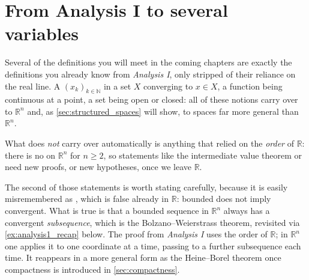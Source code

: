 \section{From Analysis I to several variables}
\label{sec:analysis1_recap}

Several of the definitions you will meet in the coming chapters are exactly the definitions you
already know from \emph{Analysis I}, only stripped of their reliance on the real line. A
  $(x_k)_{k \in \mathbb{N}}$ in a set $X$ converging to
$x \in X$, a function being continuous at a point, a set being open or closed: all of these
notions carry over to $\mathbb{R}^n$ and, as \cref{sec:structured_spaces} will show, to spaces far
more general than $\mathbb{R}^n$.

What does \emph{not} carry over automatically is anything
that relied on the \emph{order} of $\mathbb{R}$: there is no \qt{$\leq$} on $\mathbb{R}^n$ for
$n \geq 2$, so statements like the intermediate value theorem or  need new proofs, or new hypotheses, once we leave $\mathbb{R}$.

\begin{remark}
The second of those statements is worth stating carefully, because it is easily misremembered as
, which is false already in $\mathbb{R}$: bounded does not
imply convergent. What is true is that a bounded sequence in $\mathbb{R}^n$ always has a
convergent \emph{subsequence}, which is the Bolzano--Weierstrass theorem, revisited via
\cref{ex:analysis1_recap} below. The proof from \emph{Analysis I} uses the order of
$\mathbb{R}$; in $\mathbb{R}^n$ one applies it to one coordinate at a time, passing to a further
subsequence each time. It reappears in a more general form as the Heine--Borel theorem once
compactness is introduced in \cref{sec:compactness}.
\end{remark}

